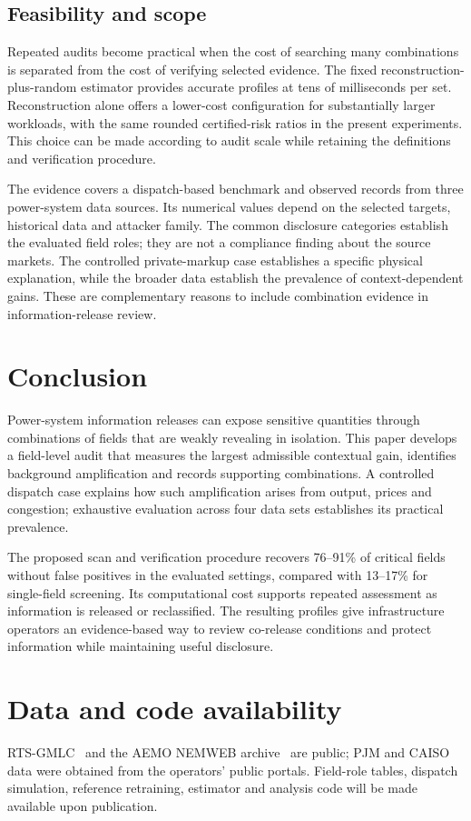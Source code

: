 \subsection{Feasibility and scope}
Repeated audits become practical when the cost of searching many combinations is separated from the cost of verifying selected evidence. The fixed reconstruction-plus-random estimator provides accurate profiles at tens of milliseconds per set. Reconstruction alone offers a lower-cost configuration for substantially larger workloads, with the same rounded certified-risk ratios in the present experiments. This choice can be made according to audit scale while retaining the definitions and verification procedure.

The evidence covers a dispatch-based benchmark and observed records from three power-system data sources. Its numerical values depend on the selected targets, historical data and attacker family. The common disclosure categories establish the evaluated field roles; they are not a compliance finding about the source markets. The controlled private-markup case establishes a specific physical explanation, while the broader data establish the prevalence of context-dependent gains. These are complementary reasons to include combination evidence in information-release review.

\section{Conclusion}\label{sec:conclusion}
Power-system information releases can expose sensitive quantities through combinations of fields that are weakly revealing in isolation. This paper develops a field-level audit that measures the largest admissible contextual gain, identifies background amplification and records supporting combinations. A controlled dispatch case explains how such amplification arises from output, prices and congestion; exhaustive evaluation across four data sets establishes its practical prevalence.

The proposed scan and verification procedure recovers 76--91\% of critical fields without false positives in the evaluated settings, compared with 13--17\% for single-field screening. Its computational cost supports repeated assessment as information is released or reclassified. The resulting profiles give infrastructure operators an evidence-based way to review co-release conditions and protect information while maintaining useful disclosure.

\section*{Data and code availability}
RTS-GMLC~\cite{barrows2020rts} and the AEMO NEMWEB archive~\cite{aemo2024nemweb} are public; PJM and CAISO data were obtained from the operators' public portals. Field-role tables, dispatch simulation, reference retraining, estimator and analysis code will be made available upon publication.
